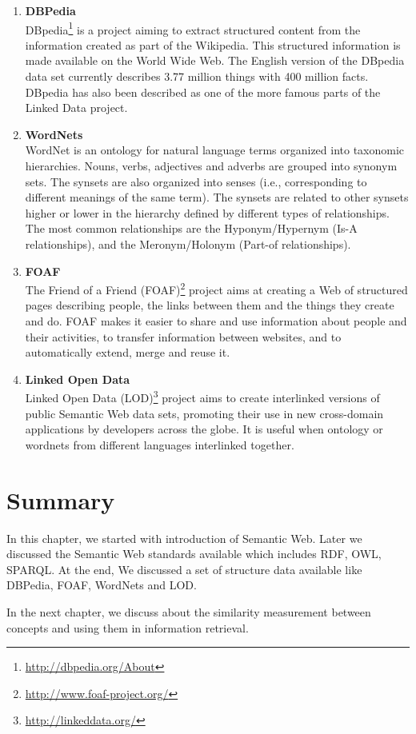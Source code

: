 \begin{enumerate}

\item{\textbf{DBPedia}}\\
DBpedia\footnote{\url{http://dbpedia.org/About}} is a project aiming to extract structured content from the information created as part of the Wikipedia. This structured information is made available on the World Wide Web. The English version of the DBpedia data set currently describes 3.77 million things with 400 million facts. DBpedia has also been described as one of the more famous parts of the Linked Data project.

\item{\textbf{WordNets}}\\
WordNet is an ontology for natural language terms organized into taxonomic hierarchies. Nouns, verbs, adjectives and adverbs are grouped into synonym sets. The synsets are also organized into senses (i.e., corresponding to different meanings of the same term). The synsets are related to other synsets higher or lower in the hierarchy defined by different types of relationships. The most common relationships are the Hyponym/Hypernym (Is-A relationships), and the Meronym/Holonym (Part-of relationships).

\item{\textbf{FOAF}}\\
The Friend of a Friend (FOAF)\footnote{\url{http://www.foaf-project.org/}} project aims at creating a Web of structured pages describing people, the links between them and the things they create and do. FOAF makes it easier to share and use information about people and their activities, to transfer information between websites, and to automatically extend, merge and reuse it.

\item{\textbf{Linked Open Data}}\\
Linked Open Data (LOD)\footnote{\url{http://linkeddata.org/}} project aims to create interlinked versions of public Semantic Web data sets, promoting their use in new cross-domain applications by developers across the globe. It is useful when ontology or wordnets from different languages interlinked together. 
\end{enumerate}

\section*{Summary}
In this chapter, we started with introduction of Semantic Web. Later we discussed the Semantic Web standards available which includes RDF, OWL, SPARQL. At the end, We discussed a set of structure data available like DBPedia, FOAF, WordNets and LOD.

In the next chapter, we discuss about the similarity measurement between concepts and using them in information retrieval. 
